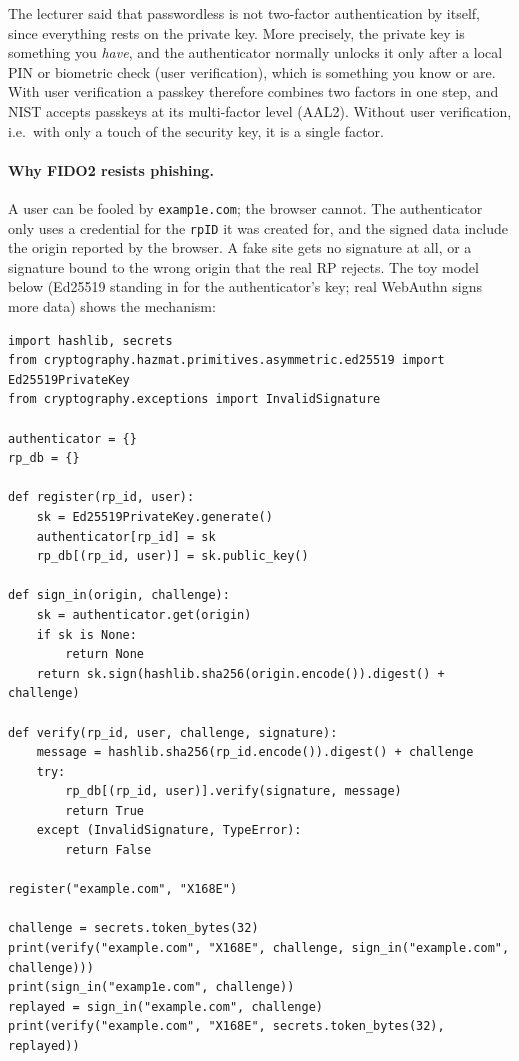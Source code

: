 \begin{remark}
The lecturer said that passwordless is not two-factor authentication by itself, since everything rests on the private key. More precisely, the private key is something you \emph{have}, and the authenticator normally unlocks it only after a local PIN or biometric check (user verification), which is something you know or are. With user verification a passkey therefore combines two factors in one step, and NIST accepts passkeys at its multi-factor level (AAL2). Without user verification, i.e.\ with only a touch of the security key, it is a single factor.
\end{remark}

\paragraph{Why FIDO2 resists phishing.} A user can be fooled by \texttt{examp1e.com}; the browser cannot. The authenticator only uses a credential for the \texttt{rpID} it was created for, and the signed data include the origin reported by the browser. A fake site gets no signature at all, or a signature bound to the wrong origin that the real RP rejects. The toy model below (Ed25519 standing in for the authenticator's key; real WebAuthn signs more data) shows the mechanism:

\begin{verbatim}
import hashlib, secrets
from cryptography.hazmat.primitives.asymmetric.ed25519 import Ed25519PrivateKey
from cryptography.exceptions import InvalidSignature

authenticator = {}
rp_db = {}

def register(rp_id, user):
    sk = Ed25519PrivateKey.generate()
    authenticator[rp_id] = sk
    rp_db[(rp_id, user)] = sk.public_key()

def sign_in(origin, challenge):
    sk = authenticator.get(origin)
    if sk is None:
        return None
    return sk.sign(hashlib.sha256(origin.encode()).digest() + challenge)

def verify(rp_id, user, challenge, signature):
    message = hashlib.sha256(rp_id.encode()).digest() + challenge
    try:
        rp_db[(rp_id, user)].verify(signature, message)
        return True
    except (InvalidSignature, TypeError):
        return False

register("example.com", "X168E")

challenge = secrets.token_bytes(32)
print(verify("example.com", "X168E", challenge, sign_in("example.com", challenge)))
print(sign_in("examp1e.com", challenge))
replayed = sign_in("example.com", challenge)
print(verify("example.com", "X168E", secrets.token_bytes(32), replayed))
\end{verbatim}

